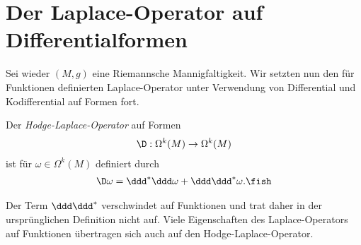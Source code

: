 \documentclass[%
	paper=a5,%
	fleqn,%
	DIV=18,%
	BCOR=0mm,
	fontsize=11pt,
	titlepage=false,%
	bibliography=totoc,
	DIV=18,%
	twoside=true,
	pdftitle=Riemannsche Geometrie,
	pdfauthor=Uwe Semmelmann,
	numbers=noendperiod]%
	{scrbook}
\begin{document}
\section{Der Laplace-Operator auf Differentialformen}

Sei wieder $(M,g)$ eine Riemannsche Mannigfaltigkeit. Wir setzten nun den für Funktionen definierten Laplace-Operator unter Verwendung von Differential und Kodifferential auf Formen fort.

\begin{defn}
Der \emph{Hodge-Laplace-Operator} auf Formen
\begin{align*}
\D : \Omega^k(M)\to \Omega^k(M)
\end{align*}
ist für $\omega\in\Omega^k(M)$ definiert durch
\begin{align*}
\D\omega = \ddd^*\ddd\omega + \ddd\ddd^*\omega.\fish
\end{align*}
\end{defn}

Der Term $\ddd\ddd^*$ verschwindet auf Funktionen und trat daher in der ursprünglichen Definition nicht auf. Viele Eigenschaften des Laplace-Operators auf Funktionen übertragen sich auch auf den Hodge-Laplace-Operator.
\end{document}
